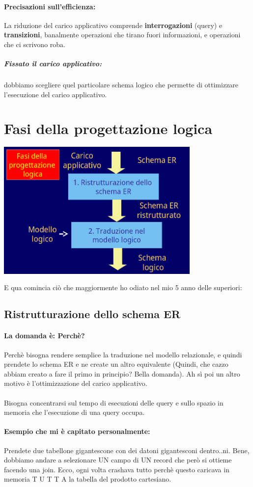 \documentclass[12pt, a4paper, openany, twoside]{book}
\begin{document}
\paragraph{Precisazioni sull'efficienza:} La riduzione del carico applicativo
comprende \textbf{interrogazioni} (query) e \textbf{transizioni}, banalmente
operazioni che tirano fuori informazioni, e operazioni che ci scrivono roba.
\subparagraph{Fissato il carico applicativo:} dobbiamo scegliere quel particolare 
schema logico che permette di ottimizzare l'esecuzione del carico applicativo.
\section{Fasi della progettazione logica}
\begin{center}
\includegraphics[width=0.75\textwidth]{11}
\end{center}
E qua comincia ciò che maggiormente ho odiato nel mio 5 anno delle superiori:
\subsection{Ristrutturazione dello schema ER}
\paragraph{La domanda è: Perchè?} Perchè bisogna rendere semplice la
traduzione nel modello relazionale, e quindi prendete lo schema ER e ne 
create un altro equivalente (Quindi, che cazzo abbiam creato a fare
il primo in principio? Bella domanda). 
Ah sì poi un altro motivo è l'ottimizzazione del carico applicativo.\\ \\
Bisogna concentrarsi sul tempo di esecuzioni delle query e sullo spazio in
memoria che l'esecuzione di una query occupa. 
\paragraph{Esempio che mi è capitato personalmente:} Prendete due tabellone 
gigantescone con dei datoni gigantesconi dentro..ni. Bene, dobbiamo andare a 
selezionare UN campo di UN record che però si ottieme facendo una join. Ecco, ogni
volta crashava tutto perchè questo caricava in memoria T U T T A la tabella
del prodotto cartesiano. 
\end{document}
